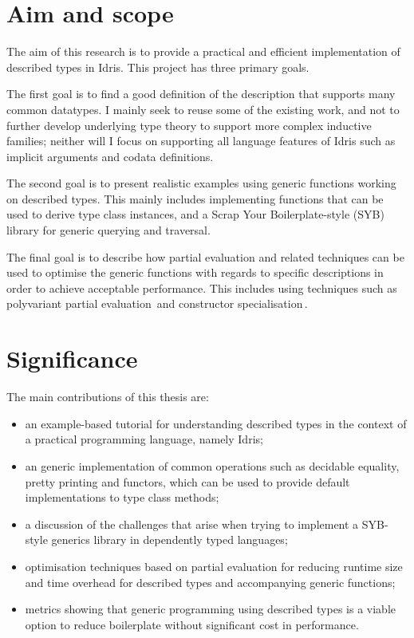\documentclass{ituthesis}
\theoremstyle{break}
\begin{document}
\section{Aim and scope}
\label{sec:AimandScope}
The aim of this research is to provide a practical and efficient implementation of described types in Idris.
This project has three primary goals.

The first goal is to find a good definition of the description that supports many common datatypes.
I mainly seek to reuse some of the existing work, and not to further develop underlying type theory to support more complex inductive families; neither will I focus on supporting all language features of Idris such as implicit arguments and codata definitions.

The second goal is to present realistic examples using generic functions working on described types. 
This mainly includes implementing functions that can be used to derive type class instances, and a Scrap Your Boilerplate-style (SYB) library for generic querying and traversal.

The final goal is to describe how partial evaluation and related techniques can be used to optimise the generic functions with regards to specific descriptions in order to achieve acceptable performance.
This includes using techniques such as polyvariant partial evaluation\,\autocite{Jones:1993:PEA:153676} and constructor specialisation\,\autocite{Mogensen:1993:CS:154630.154633}. %

\section{Significance}
\label{sec:Significance}
The main contributions of this thesis are:

\begin{itemize}
  \item an example-based tutorial for understanding described types in the context of a practical programming language, namely Idris;
  \item an generic implementation of common operations such as decidable equality, pretty printing and functors, which can be used to provide default implementations to type class methods;
  \item a discussion of the challenges that arise when trying to implement a SYB-style generics library in dependently typed languages;
  \item optimisation techniques based on partial evaluation for reducing runtime size and time overhead for described types and accompanying generic functions;
  \item metrics showing that generic programming using described types is a viable option to reduce boilerplate without significant cost in performance.
\end{itemize}
\end{document}
